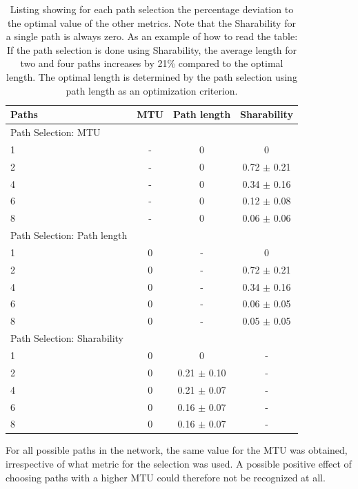 \begin{table}
	\begin{center}
		\begin{tabular}{lccc}\toprule
			   			Paths & MTU & Path length & Sharability \\\midrule
			
			{\footnotesize Path Selection: }MTU			& & & \\
			1  	& - & 0 & 0    \\
			2  	& - & 0 & 0.72 {\small $\pm$ 0.21}  \\
			4  	& - & 0 & 0.34 {\small $\pm$ 0.16} \\
			6  	& - & 0 & 0.12 {\small $\pm$ 0.08} \\
			8  	& - & 0 & 0.06 {\small $\pm$ 0.06} \smallskip\\
			{\footnotesize Path Selection: }Path length  	& & & \\
			1  	& 0 & - & 0    \\
			2  	& 0 & - & 0.72 {\small $\pm$ 0.21} \\
			4  	& 0 & - & 0.34 {\small $\pm$ 0.16} \\
			6  	& 0 & - & 0.06 {\small $\pm$ 0.05} \\
			8 		& 0 & - & 0.05 {\small $\pm$ 0.05} \smallskip\\
			{\footnotesize Path Selection: }Sharability		& & & \\
			1  	& 0 & 0    & - \\
			2 	& 0 & 0.21 {\small $\pm$ 0.10}  & - \\
			4  	& 0 & 0.21 {\small $\pm$ 0.07} & - \\
			6  	& 0 & 0.16 {\small $\pm$ 0.07} & - \\
			8  	& 0 & 0.16 {\small $\pm$  0.07} & - \\\bottomrule
		\end{tabular}
		\caption{Listing showing for each path selection the percentage deviation
			to the optimal value of the other metrics. Note that the Sharability for a single path is always zero. As an example of how to read the table: If the path selection is done using Sharability, the average length for two and four paths increases by 21\% compared to the optimal length. The optimal length is determined by the path selection using path length as an optimization criterion.}
		\label{tab:DiffFromOptimal}
	\end{center}
\end{table}

For all possible paths in the network, the same value for the MTU was obtained, irrespective of what metric for the selection was used. A possible positive effect of choosing paths with a higher MTU could therefore not be recognized at all. 

